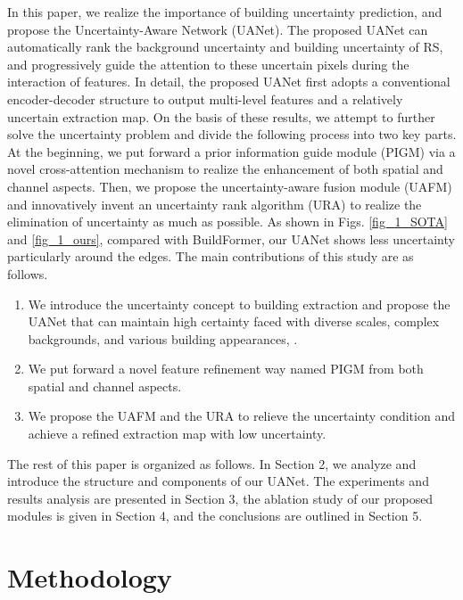 \documentclass[lettersize,journal]{IEEEtran}
\begin{document}
\par
In this paper, we realize the importance of building uncertainty prediction, and propose the Uncertainty-Aware Network (UANet).
The proposed UANet can automatically rank the background uncertainty and building uncertainty of RS, and progressively guide the attention to these uncertain pixels during the interaction of features.
In detail, the proposed UANet first adopts a conventional encoder-decoder structure to output multi-level features and a relatively uncertain extraction map. On the basis of these results, we attempt to further solve the uncertainty problem and divide the following process into two key parts.
At the beginning, we put forward a prior information guide module (PIGM) via a novel cross-attention mechanism to realize the enhancement of both spatial and channel aspects. Then, we propose the uncertainty-aware fusion module (UAFM) and innovatively invent an uncertainty rank algorithm (URA) to realize the elimination of uncertainty as much as possible. As shown in Figs. \ref{fig_1_SOTA} and \ref{fig_1_ours}, compared with BuildFormer, our UANet shows less uncertainty particularly around the edges. The main contributions of this study are as follows.

\begin{enumerate}[]
\item We introduce the uncertainty concept to building extraction and propose the UANet that can maintain high certainty faced with diverse scales, complex backgrounds, and various building appearances, . 
\item We put forward a novel feature refinement way named PIGM from both spatial and channel aspects.
\item We propose the UAFM and the URA to relieve the uncertainty condition and achieve a refined extraction map with low uncertainty.
\end{enumerate}
\par
The rest of this paper is organized as follows. In Section 2, we analyze and introduce the structure and components of our UANet. The experiments and results analysis are presented in Section 3, the ablation study of our proposed modules is given in Section 4, and the conclusions are outlined in Section 5.

\section{Methodology}
\end{document}
